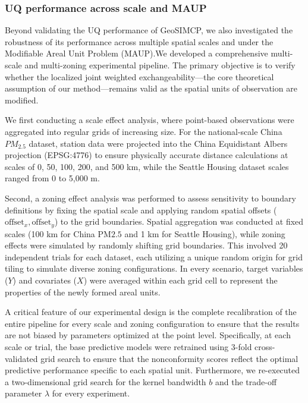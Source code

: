 \documentclass[authoryear,preprint,review,12pt]{elsarticle}
\begin{document}
\subsubsection{UQ performance across scale and MAUP}
{
\color{red}

Beyond validating the UQ performance of GeoSIMCP, we also investigated the robustness of its performance across multiple spatial scales and under the Modifiable Areal Unit Problem (MAUP).We developed a comprehensive multi-scale and multi-zoning experimental pipeline. The primary objective is to verify whether the localized joint weighted exchangeability—the core theoretical assumption of our method—remains valid as the spatial units of observation are modified. 

We first conducting a scale effect analysis, where point-based observations were aggregated into regular grids of increasing size. For the national-scale China $PM_{2.5}$ dataset, station data were projected into the China Equidistant Albers projection (EPSG:4776) to ensure physically accurate distance calculations at scales of 0, 50, 100, 200, and 500 km, while the Seattle Housing dataset scales ranged from 0 to 5,000 m. 

Second, a zoning effect analysis was performed to assess sensitivity to boundary definitions by fixing the spatial scale and applying random spatial offsets ($\text{offset}_x, \text{offset}_y$) to the grid boundaries. Spatial aggregation was conducted at fixed scales (100 km for China PM${2.5}$ and 1 km for Seattle Housing), while zoning effects were simulated by randomly shifting grid boundaries. This involved 20 independent trials for each dataset, each utilizing a unique random origin for grid tiling to simulate diverse zoning configurations. In every scenario, target variables ($Y$) and covariates ($X$) were averaged within each grid cell to represent the properties of the newly formed areal units.

A critical feature of our experimental design is the complete recalibration of the entire pipeline for every scale and zoning configuration to ensure that the results are not biased by parameters optimized at the point level. Specifically, at each scale or trial, the base predictive models were retrained using 3-fold cross-validated grid search to ensure that the nonconformity scores reflect the optimal predictive performance specific to each spatial unit. Furthermore, we re-executed a two-dimensional grid search for the kernel bandwidth $b$ and the trade-off parameter $\lambda$ for every experiment.
}
\end{document}
